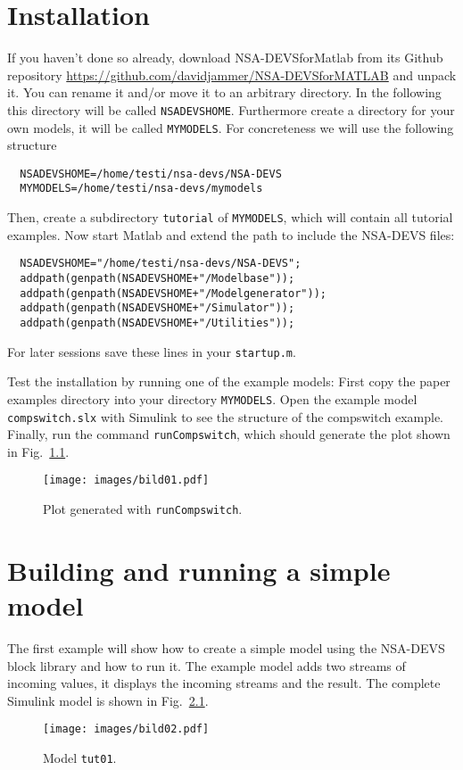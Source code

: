 \documentclass[12pt,oneside,a4paper,bibtotoc,BCOR=0pt,DIV=20]{scrreprt}
\newcommand{\cft}[1]{\mbox{\texttt{#1}}}   %
\begin{document}
\chapter{Installation}

If you haven't done so already, download NSA-DEVSforMatlab from its Github
repository \url{https://github.com/davidjammer/NSA-DEVSforMATLAB} and unpack
it. You can rename it and/or move it to an
arbitrary directory. In the
following this directory will be called \cft{NSADEVSHOME}. Furthermore create a
directory for your own models, it will be called \cft{MYMODELS}. For
concreteness we will use the following structure
\begin{Verbatim}  
  NSADEVSHOME=/home/testi/nsa-devs/NSA-DEVS
  MYMODELS=/home/testi/nsa-devs/mymodels
\end{Verbatim}
Then, create a subdirectory \cft{tutorial} of \cft{MYMODELS}, which will
contain all tutorial examples. Now start Matlab and extend the path to include
the NSA-DEVS files:
\begin{Verbatim}  
  NSADEVSHOME="/home/testi/nsa-devs/NSA-DEVS";
  addpath(genpath(NSADEVSHOME+"/Modelbase"));
  addpath(genpath(NSADEVSHOME+"/Modelgenerator"));
  addpath(genpath(NSADEVSHOME+"/Simulator"));
  addpath(genpath(NSADEVSHOME+"/Utilities"));
\end{Verbatim}
For later sessions save these lines in your \cft{startup.m}.

Test the installation by running one of the example models: First copy the
paper examples directory into your directory \cft{MYMODELS}. Open the example
model \cft{compswitch.slx} with Simulink to see the structure of the compswitch
example. Finally, run the command \cft{runCompswitch}, which should generate
the plot shown in Fig.\ \ref{fig_1}.
\begin{figure}[ht]
\centering
\texttt{[image: images/bild01.pdf]}
\caption{Plot generated with \cft{runCompswitch}.}
\label{fig_1}
\end{figure}

 
\chapter{Building and running a simple model} \label{sec3}

The first example will show how to create a simple model using the NSA-DEVS
block library and how to run it. The example model adds two streams of incoming
values, it displays the incoming streams and the result. The complete Simulink
model is shown in Fig.\ \ref{fig_2}.
\begin{figure}[ht]
\centering
\texttt{[image: images/bild02.pdf]}
\caption{Model \cft{tut01}.}
\label{fig_2}
\end{figure}
\end{document}
